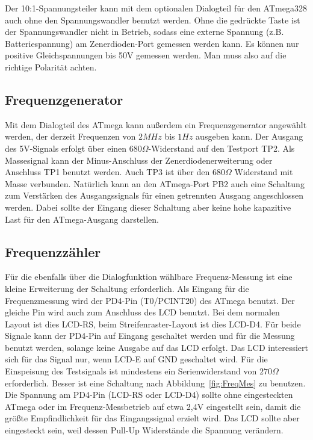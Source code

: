 Der 10:1-Spannungsteiler kann mit dem optionalen Dialogteil für den ATmega328 auch ohne 
den Spannungswandler benutzt werden. Ohne die gedrückte Taste ist der Spannungswandler nicht in 
Betrieb, sodass eine externe Spannung (z.B. Batteriespannung) am Zenerdioden-Port gemessen werden kann.
Es können nur positive Gleichspannungen bis 50V gemessen werden.
Man muss also auf die richtige Polarität achten.

\subsection{Frequenzgenerator}

Mit dem Dialogteil des ATmega kann außerdem ein Frequenzgenerator angewählt werden, der derzeit
Frequenzen von \(2 MHz\) bis \(1 Hz\) ausgeben kann. Der Ausgang des 5V-Signals erfolgt über
einen \(680\Omega\)-Widerstand auf den Testport TP2. Als Massesignal kann der Minus-Anschluss
der Zenerdiodenerweiterung oder Anschluss TP1 benutzt werden.
Auch TP3 ist über den \(680\Omega\) Widerstand mit Masse verbunden.
Natürlich kann an den ATmega-Port PB2 auch eine Schaltung zum Verstärken des Ausgangssignals 
für einen getrennten Ausgang angeschlossen werden. Dabei sollte der Eingang dieser Schaltung
aber keine hohe kapazitive Last für den ATmega-Ausgang darstellen.

\subsection{Frequenzzähler}
\label{sec:frequency_counter}

Für die ebenfalls über die Dialogfunktion wählbare Frequenz-Messung ist eine kleine Erweiterung
der Schaltung erforderlich. Als Eingang für die Frequenzmessung wird der PD4-Pin (T0/PCINT20) des
ATmega benutzt. Der gleiche Pin wird auch zum Anschluss des LCD benutzt. Bei dem normalen Layout
ist dies LCD-RS, beim Streifenraster-Layout ist dies LCD-D4. Für beide Signale kann der PD4-Pin
auf Eingang geschaltet werden und für die Messung benutzt werden, solange keine Ausgabe auf das
LCD erfolgt. Das LCD interessiert sich für das Signal nur, wenn LCD-E auf GND geschaltet wird.
Für die Einspeisung des Testsignals ist mindestens ein Serienwiderstand von \(270\Omega\) erforderlich.
Besser ist eine Schaltung nach Abbildung~\ref{fig:FreqMes} zu benutzen. Die Spannung am PD4-Pin (LCD-RS oder
LCD-D4) sollte ohne eingesteckten ATmega oder im Frequenz-Messbetrieb auf etwa 2,4V eingestellt sein,
damit die größte Empfindlichkeit für das Eingangssignal erzielt wird. Das LCD sollte aber eingesteckt sein,
weil dessen Pull-Up Widerstände die Spannung verändern.

